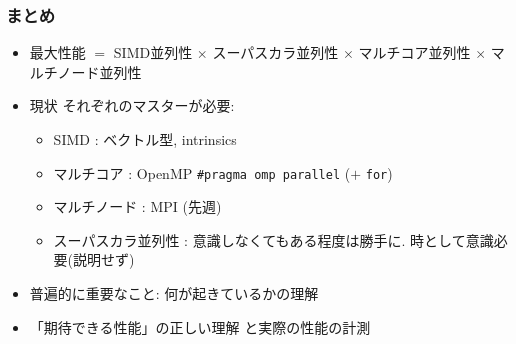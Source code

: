 \documentclass[10pt,dvipdfmx]{beamer}
\newcommand{\ao}[1]{{\color{blue}#1}}
\begin{document}
\begin{frame}[fragile]
  \frametitle{まとめ}

  \begin{itemize}
  \item 最大性能 $=$ \ao{SIMD並列性} $\times$ スーパスカラ並列性
    $\times$ \ao{マルチコア並列性} $\times$ マルチノード並列性
  \item 現状 それぞれのマスターが必要:
    \begin{itemize}
    \item SIMD : ベクトル型, intrinsics
    \item マルチコア : OpenMP {\tt \#pragma omp parallel} ($+$ {\tt for})
    \item マルチノード : MPI (先週)
    \item スーパスカラ並列性 : 意識しなくてもある程度は勝手に.
      時として意識必要(説明せず)
    \end{itemize}
  \item 普遍的に重要なこと: 何が起きているかの理解
  \item 「期待できる性能」の正しい理解
    と実際の性能の計測
  \end{itemize}
\end{frame}
\end{document}
